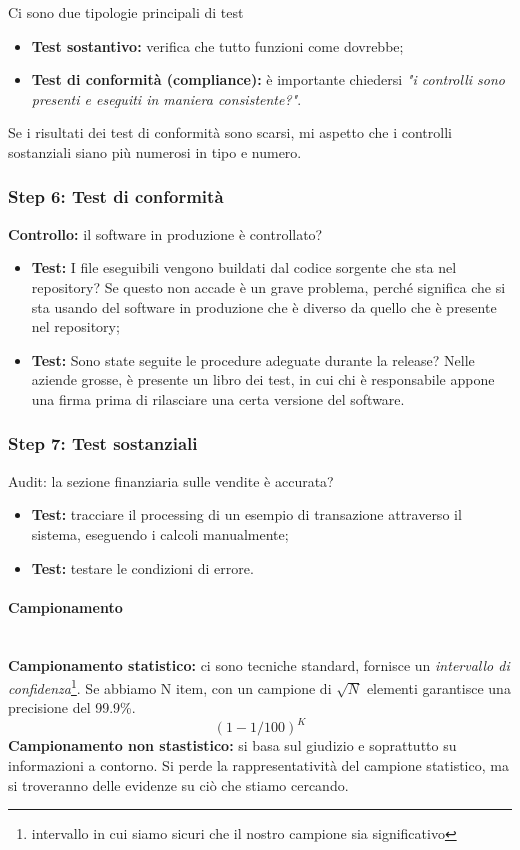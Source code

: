 Ci sono due tipologie principali di test
\begin{itemize}
\item \textbf{Test sostantivo:} verifica che tutto funzioni come dovrebbe;
\item \textbf{Test di conformità (compliance):} è importante chiedersi  \textit{
"i controlli sono presenti e eseguiti in maniera consistente?"}.
\end{itemize}

Se i risultati dei test di conformità sono scarsi, mi aspetto che i controlli
sostanziali siano più numerosi in tipo e numero.

\subsubsection{Step 6: Test di conformità}

\textbf{Controllo:} il software in produzione è controllato?
\begin{itemize}
\item \textbf{Test:} I file eseguibili vengono buildati dal codice sorgente che
sta nel repository? Se questo non accade è un grave problema, perché significa
che si sta usando del software in produzione che è diverso da quello che è
presente nel repository;
\item \textbf{Test:} Sono state seguite le procedure adeguate durante la
release? Nelle aziende grosse, è presente un libro dei test, in cui chi è
responsabile appone una firma prima di rilasciare una certa versione del
software.
\end{itemize}


\subsubsection{Step 7: Test sostanziali}

Audit: la sezione finanziaria sulle vendite è accurata?

\begin{itemize}
\item \textbf{Test:} tracciare il processing di un esempio di transazione
attraverso il sistema, eseguendo i calcoli manualmente;
\item \textbf{Test:} testare le condizioni di errore.
\end{itemize}


\paragraph{Campionamento}\mbox{}\\

\textbf{Campionamento statistico:} ci sono tecniche standard, fornisce un
\textit{intervallo di confidenza}\footnote{intervallo in cui siamo sicuri che
il nostro campione sia significativo}. Se abbiamo N item, con un campione di
$\sqrt{N}$ elementi garantisce una precisione del 99.9\%.
$$
(1 - 1/100)^K
$$
\newline
\textbf{Campionamento non stastistico:} si basa sul giudizio e soprattutto su
informazioni a contorno. Si perde la rappresentatività del campione statistico,
ma si troveranno delle evidenze su ciò che stiamo cercando.
